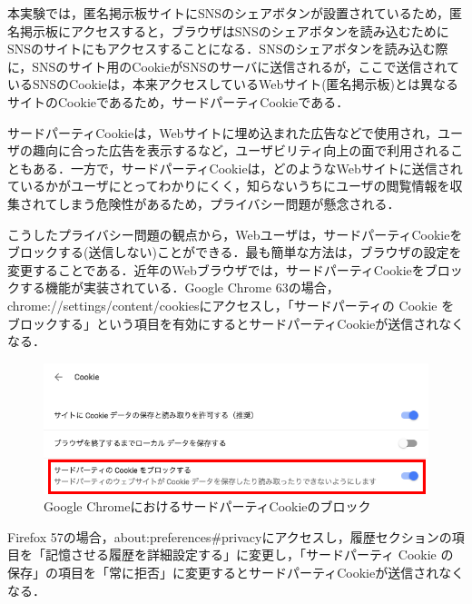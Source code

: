 \documentclass[10pt, a4paper]{jreport}
\begin{document}
本実験では，匿名掲示板サイトにSNSのシェアボタンが設置されているため，匿名掲示板にアクセスすると，ブラウザはSNSのシェアボタンを読み込むためにSNSのサイトにもアクセスすることになる．SNSのシェアボタンを読み込む際に，SNSのサイト用のCookieがSNSのサーバに送信されるが，ここで送信されているSNSのCookieは，本来アクセスしているWebサイト(匿名掲示板)とは異なるサイトのCookieであるため，サードパーティCookieである．

サードパーティCookieは，Webサイトに埋め込まれた広告などで使用され，ユーザの趣向に合った広告を表示するなど，ユーザビリティ向上の面で利用されることもある．一方で，サードパーティCookieは，どのようなWebサイトに送信されているかがユーザにとってわかりにくく，知らないうちにユーザの閲覧情報を収集されてしまう危険性があるため，プライバシー問題が懸念される\cite{third_party_cookie_is_danger}．

こうしたプライバシー問題の観点から，Webユーザは，サードパーティCookieをブロックする(送信しない)ことができる．最も簡単な方法は，ブラウザの設定を変更することである．近年のWebブラウザでは，サードパーティCookieをブロックする機能が実装されている．Google Chrome 63の場合，chrome://settings/content/cookiesにアクセスし，「サードパーティの Cookie をブロックする」という項目を有効にするとサードパーティCookieが送信されなくなる．

\begin{figure}[H]
	\begin{center}
		\includegraphics[width=130mm]{figures/disable_third_party_cookie_on_chrome.png}
	\end{center}
	\caption{Google ChromeにおけるサードパーティCookieのブロック}
	\label{fig: disable_third_party_cookie_on_chrome}
\end{figure}

\noindent
Firefox 57の場合，about:preferences\#privacyにアクセスし，履歴セクションの項目を「記憶させる履歴を詳細設定する」に変更し，「サードパーティ Cookie の保存」の項目を「常に拒否」に変更するとサードパーティCookieが送信されなくなる\cite{how_to_disable_third_party_cookie_on_firefox}．
\end{document}
